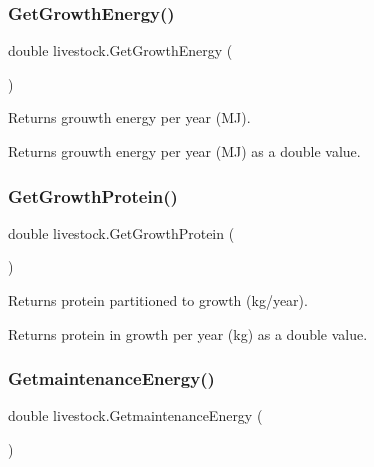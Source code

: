 \subsubsection{\texorpdfstring{GetGrowthEnergy()}{GetGrowthEnergy()}}
{\footnotesize\ttfamily double livestock.\+Get\+Growth\+Energy (\begin{DoxyParamCaption}{ }\end{DoxyParamCaption})\hspace{0.3cm}{\ttfamily [inline]}}



Returns grouwth energy per year (MJ). 

\begin{DoxyReturn}{Returns}
grouwth energy per year (MJ) as a double value. 
\end{DoxyReturn}
\mbox{\label{classlivestock_a041d8fd0f88b5c6c017135632867efc5}} 
\subsubsection{\texorpdfstring{GetGrowthProtein()}{GetGrowthProtein()}}
{\footnotesize\ttfamily double livestock.\+Get\+Growth\+Protein (\begin{DoxyParamCaption}{ }\end{DoxyParamCaption})\hspace{0.3cm}{\ttfamily [inline]}}



Returns protein partitioned to growth (kg/year). 

\begin{DoxyReturn}{Returns}
protein in growth per year (kg) as a double value. 
\end{DoxyReturn}
\mbox{\label{classlivestock_a95f8f38c956fbaa68522def23741e9c3}} 
\subsubsection{\texorpdfstring{GetmaintenanceEnergy()}{GetmaintenanceEnergy()}}
{\footnotesize\ttfamily double livestock.\+Getmaintenance\+Energy (\begin{DoxyParamCaption}{ }\end{DoxyParamCaption})\hspace{0.3cm}{\ttfamily [inline]}}



